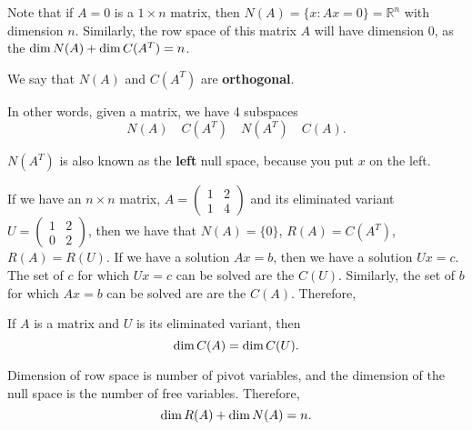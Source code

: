 
Note that if \( A=0 \) is a \( 1\times n \) matrix, then \( N(A) = \{x : Ax=0\} = \mathbb{R}^{n}  \) with dimension \( n \). Similarly, the row space of this matrix \( A \) will have dimension 0, as the \( \operatorname{dim} N(A) + \operatorname{dim} C(A^{T} ) =n\).

\begin{definition}
	We say that \( N(A) \) and \( C(A^{T} ) \) are \textbf{orthogonal}.
\end{definition}

In other words, given a matrix, we have 4 subspaces \[
	N(A) \quad C(A^{T}) \quad N(A^{T} ) \quad C(A)
.\] 

\begin{definition}
	\( N(A^{T} ) \) is also known as the \textbf{left} null space, because you put \( x \) on the left.
\end{definition}

If we have an \( n\times n \) matrix, \( A = \begin{pmatrix}
	1 & 2 \\ 1 & 4
\end{pmatrix} \) and its eliminated variant \( U=\begin{pmatrix}
	1 & 2  \\ 0 & 2
\end{pmatrix} \), then we have that \( N(A) = \{0\}   \), \( R(A) = C(A^{T} ) \), \( R(A) = R(U) \). If we have a solution \( Ax=b \), then we have a solution \( Ux=c \). The set of \( c \) for which \( Ux=c \) can be solved are the \( C(U) \). Similarly, the set of \( b \) for which \( Ax=b \) can be solved are are the \( C(A) \). Therefore, 

\begin{prop}
	If \( A \) is a matrix and \( U \) is its eliminated variant, then \[
	\operatorname{dim} C(A) = \operatorname{dim} C(U)
.\] 
\end{prop}

\begin{prop}
	Dimension of row space is number of pivot variables, and the dimension of the null space is the number of free variables. Therefore, \[
		\operatorname{dim} R(A) + \operatorname{dim} N(A) = n
	.\] 
\end{prop}
